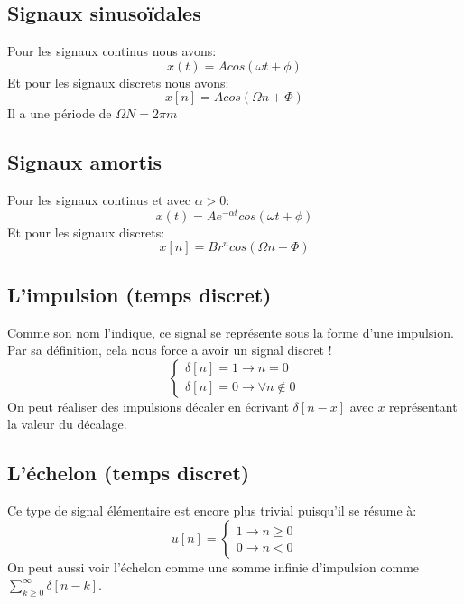\documentclass{report}
\begin{document}
\subsection{Signaux sinusoïdales}
Pour les signaux continus nous avons:
\begin{equation}
x(t) = A cos(\omega t + \phi)
\end{equation}
Et pour les signaux discrets nous avons:
\begin{equation}
x[n] = A cos(\Omega n + \Phi)
\end{equation}
Il a une période de $\Omega N = 2 \pi m$

\subsection{Signaux amortis}
Pour les signaux continus et avec $\alpha > 0$:
\begin{equation}
x(t) = A e^{-\alpha t}cos(\omega t + \phi)
\end{equation}
Et pour les signaux discrets:
\begin{equation}
x[n] = Br^ncos(\Omega n + \Phi)
\end{equation}

\subsection{L'impulsion (temps discret)}
Comme son nom l'indique, ce signal se représente sous la forme d'une impulsion. Par sa définition, cela nous force a avoir un signal discret !
\begin{equation}
\begin{cases}
\delta [n] = 1 \rightarrow n = 0 \\
\delta [n] = 0 \rightarrow \forall n \notin 0
\end{cases}
\end{equation}
On peut réaliser des impulsions décaler en écrivant $\delta [n-x]$ avec $x$ représentant la valeur du décalage.

\subsection{L'échelon (temps discret)}
Ce type de signal élémentaire est encore plus trivial puisqu'il se résume à:
\begin{equation}\label{eq:1}
u[n]=
\begin{cases}
1 \rightarrow n \geq 0 \\
0 \rightarrow n < 0
\end{cases}
\end{equation}
On peut aussi voir l'échelon comme une somme infinie d'impulsion comme $\sum_{k \geq 0}^{\infty} \delta[n-k]$.
\end{document}
